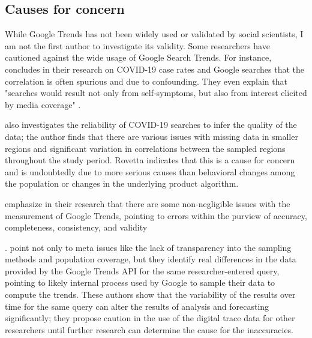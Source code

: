 \subsection{Causes for concern}

While Google Trends has not been widely used or validated by social scientists,
I am not the first author to investigate its validity.
Some researchers have cautioned against the wide usage of Google Search Trends. For instance, \citet{asseoTrackingCOVID19Using2020} 
concludes in their research on COVID-19 case rates and Google searches that the correlation 
is often spurious and due to confounding. They even explain that "searches would
result not only from self-symptoms, but also from interest elicited by
media coverage" \citep[][p.1]{asseoTrackingCOVID19Using2020}.

\citet{rovetta21} also investigates the reliability of COVID-19 searches to infer 
the quality of the data; the author finds that there are various issues with missing data in 
smaller regions and significant variation in correlations between the sampled regions throughout
the study period. Rovetta indicates that this is a cause for concern and is undoubtedly due to more 
serious causes than behavioral changes among the population or changes in the underlying product algorithm. 

\citet{cebrian_domenech22} emphasize in their research that there are some 
non-negligible issues with the measurement of Google Trends, pointing to 
errors within the purview of accuracy, completeness, consistency, and validity

\citep{KarrDataQuality}. \citet{cebrian_domenech22} point not only to 
meta issues like the lack of transparency into the sampling methods 
and population coverage, but they identify real differences 
in the data provided by the Google Trends API for the same 
researcher-entered query, pointing 
to likely internal process used by Google to sample their data to compute the trends.
These authors show that the variability of the results over time for the same query
can alter the results of analysis and forecasting significantly; they propose
caution in the use of the digital trace data for other researchers until
further research can determine the cause for the inaccuracies. 


